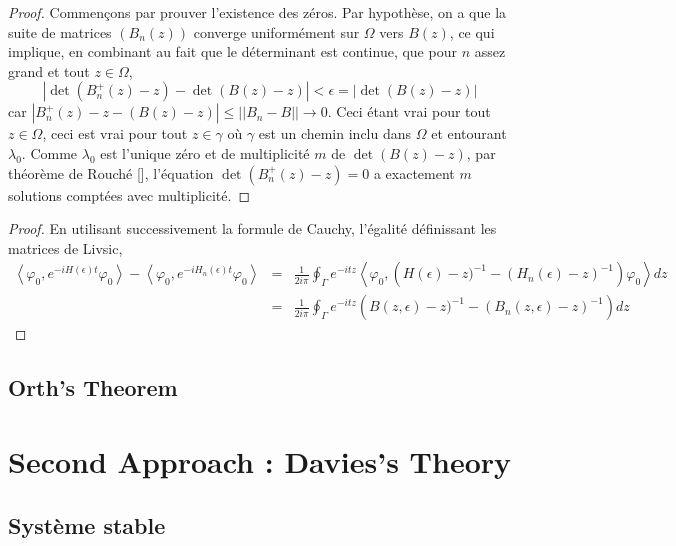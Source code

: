 \documentclass[12pt,openany,a4paper, titlepage]{article}
\newcommand{\f}[2]{\frac{#1}{#2}}
\newcommand{\lp}{\left(}
\newcommand{\rp}{\right)}
\newcommand{\la}{\left\langle}
\newcommand{\ra}{\right\rangle}
\theoremstyle{definition}
\theoremstyle{definition}
\theoremstyle{definition}
\theoremstyle{definition}
\theoremstyle{definition}
\theoremstyle{definition}
\begin{document}
\begin{proof}
Commençons par prouver l'existence des zéros. Par hypothèse, on a que la suite de matrices $(B_n(z))$ converge uniformément sur $\Omega$ vers $B(z)$, ce qui implique, en combinant au fait que le déterminant est continue, que pour $n$ assez grand et tout $z\in\Omega$, $$ |\det (B_n^+(z) - z) - \det (B(z) - z)| < \epsilon = |\det (B(z) - z)| $$ car $|B_n^+(z) - z - (B(z) - z)| \leq ||B_n - B|| \rightarrow 0$. Ceci étant vrai pour tout $z\in\Omega$, ceci est vrai pour tout $z\in\gamma$ où $\gamma$ est un chemin inclu dans $\Omega$ et entourant $\lambda_0$. Comme $\lambda_0$ est l'unique zéro et de multiplicité $m$ de $\det (B(z) - z)$, par théorème de Rouché [], l'équation $\det(B_n^+(z) -z) = 0$ a exactement $m$ solutions comptées avec multiplicité.

\end{proof}

\newpage

\begin{proof}
En utilisant successivement la formule de Cauchy, l'égalité définissant les matrices de Livsic, 
\begin{eqnarray*}
\la \varphi_0,e^{-iH(\epsilon)t}\varphi_0 \ra - \la\varphi_0,e^{-iH_n(\epsilon)t}\varphi_0 \ra &=& \f{1}{2i\pi}\oint_\Gamma e^{-itz}\la \varphi_0,\lp H(\epsilon) -z)^{-1} - (H_n(\epsilon)-z)^{-1} \rp \varphi_0 \ra dz\\
&=& \f{1}{2i\pi}\oint_\Gamma e^{-itz} \lp B(z,\epsilon) -z)^{-1} - (B_n(z,\epsilon)-z)^{-1} \rp dz
\end{eqnarray*}
\end{proof}


\subsection{Orth's Theorem}

\section{Second Approach : Davies's Theory}

\subsection{Système stable}
\end{document}
